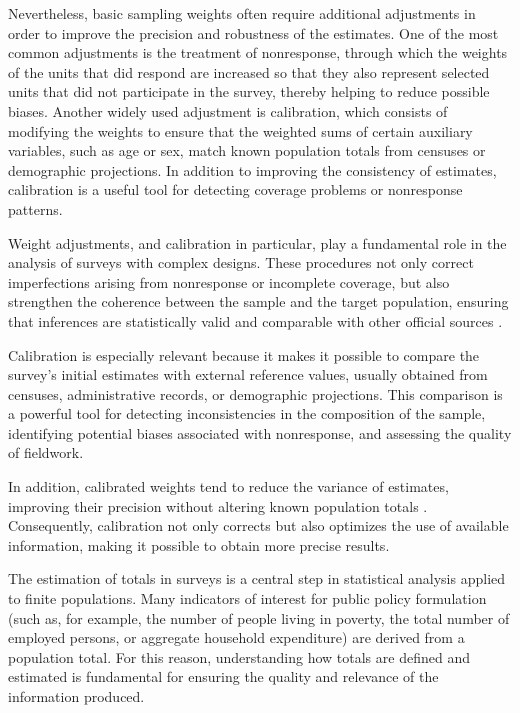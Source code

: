 \documentclass[
  english,
  12pt,
]{book}
\begin{document}
Nevertheless, basic sampling weights often require additional adjustments in order to improve the precision and robustness of the estimates. One of the most common adjustments is the treatment of nonresponse, through which the weights of the units that did respond are increased so that they also represent selected units that did not participate in the survey, thereby helping to reduce possible biases. Another widely used adjustment is calibration, which consists of modifying the weights to ensure that the weighted sums of certain auxiliary variables, such as age or sex, match known population totals from censuses or demographic projections. In addition to improving the consistency of estimates, calibration is a useful tool for detecting coverage problems or nonresponse patterns.

Weight adjustments, and calibration in particular, play a fundamental role in the analysis of surveys with complex designs. These procedures not only correct imperfections arising from nonresponse or incomplete coverage, but also strengthen the coherence between the sample and the target population, ensuring that inferences are statistically valid and comparable with other official sources \citep{kalton2003weighting}.

Calibration is especially relevant because it makes it possible to compare the survey's initial estimates with external reference values, usually obtained from censuses, administrative records, or demographic projections. This comparison is a powerful tool for detecting inconsistencies in the composition of the sample, identifying potential biases associated with nonresponse, and assessing the quality of fieldwork.

In addition, calibrated weights tend to reduce the variance of estimates, improving their precision without altering known population totals \citep{sarndal2005nonresponse}. Consequently, calibration not only corrects but also optimizes the use of available information, making it possible to obtain more precise results.

The estimation of totals in surveys is a central step in statistical analysis applied to finite populations. Many indicators of interest for public policy formulation (such as, for example, the number of people living in poverty, the total number of employed persons, or aggregate household expenditure) are derived from a population total. For this reason, understanding how totals are defined and estimated is fundamental for ensuring the quality and relevance of the information produced.
\end{document}
